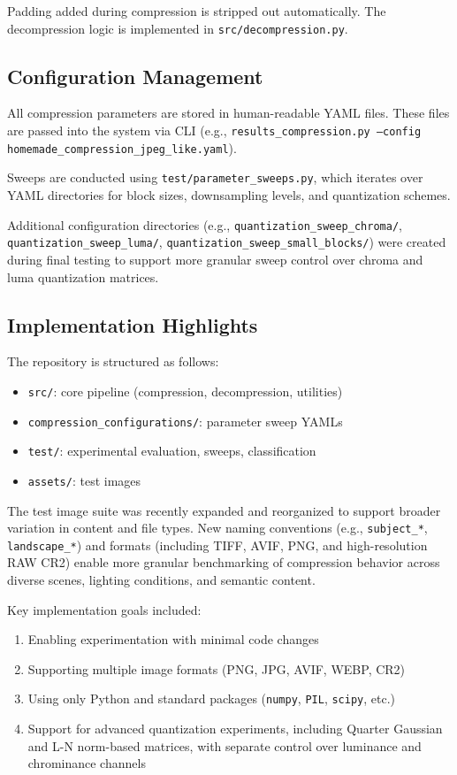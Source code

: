 Padding added during compression is stripped out automatically. The decompression logic is implemented in \texttt{src/decompression.py}.

\subsection{Configuration Management}

All compression parameters are stored in human-readable YAML files. These files are passed into the system via CLI (e.g., \texttt{results\_compression.py --config homemade\_compression\_jpeg\_like.yaml}).

Sweeps are conducted using \texttt{test/parameter\_sweeps.py}, which iterates over YAML directories for block sizes, downsampling levels, and quantization schemes.

Additional configuration directories (e.g., \texttt{quantization\_sweep\_chroma/}, \texttt{quantization\_sweep\_luma/}, \texttt{quantization\_sweep\_small\_blocks/}) were created during final testing to support more granular sweep control over chroma and luma quantization matrices.

\subsection{Implementation Highlights}

The repository is structured as follows:
\begin{itemize}
    \item \texttt{src/}: core pipeline (compression, decompression, utilities)
    \item \texttt{compression\_configurations/}: parameter sweep YAMLs
    \item \texttt{test/}: experimental evaluation, sweeps, classification
    \item \texttt{assets/}: test images
\end{itemize}

The test image suite was recently expanded and reorganized to support broader variation in content and file types. New naming conventions (e.g., \texttt{subject\_*}, \texttt{landscape\_*}) and formats (including TIFF, AVIF, PNG, and high-resolution RAW CR2) enable more granular benchmarking of compression behavior across diverse scenes, lighting conditions, and semantic content.

Key implementation goals included:
\begin{enumerate}
    \item Enabling experimentation with minimal code changes
    \item Supporting multiple image formats (PNG, JPG, AVIF, WEBP, CR2)
    \item Using only Python and standard packages (\texttt{numpy}, \texttt{PIL}, \texttt{scipy}, etc.)
    \item Support for advanced quantization experiments, including Quarter Gaussian and L-N norm-based matrices, with separate control over luminance and chrominance channels
\end{enumerate}

